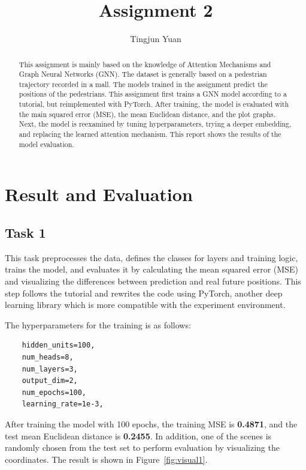 \documentclass[conference]{IEEEtran}
\begin{document}
\title{Assignment 2}

\author{Tingjun Yuan}

\maketitle

\begin{abstract}
This assignment is mainly based on the knowledge of Attention Mechanisms and
Graph Neural Networks (GNN). The dataset is generally based on a pedestrian
trajectory recorded in a mall. The models trained in the assignment predict
the positions of the pedestrians. This assignment first trains a GNN model
according to a tutorial, but reimplemented with PyTorch. After training, the
model is evaluated with the main squared error (MSE), the mean Euclidean
distance, and the plot graphs. Next, the model is reexamined by tuning
hyperparameters, trying a deeper embedding, and replacing the learned attention
mechanism. This report shows the results of the model evaluation.
\end{abstract}

\section{Result and Evaluation}

\subsection*{Task 1}

This task preprocesses the data, defines the classes for layers and training
logic, trains the model, and evaluates it by calculating the mean squared error
(MSE) and visualizing the differences between prediction and real future
positions. This step follows the tutorial \cite{cite:tut} and rewrites the code
using PyTorch, another deep learning library which is more compatible with the
experiment environment.

The hyperparameters for the training is as follows:

\begin{verbatim}
    hidden_units=100,
    num_heads=8,
    num_layers=3,
    output_dim=2,
    num_epochs=100,
    learning_rate=1e-3,
\end{verbatim}

After training the model with 100 epochs, the training MSE is \textbf{0.4871},
and the test mean Euclidean distance is \textbf{0.2455}. In addition, one of
the scenes is randomly chosen from the test set to perform evaluation by
visualizing the coordinates. The result is shown in Figure~\ref{fig:visual1}.
\end{document}
